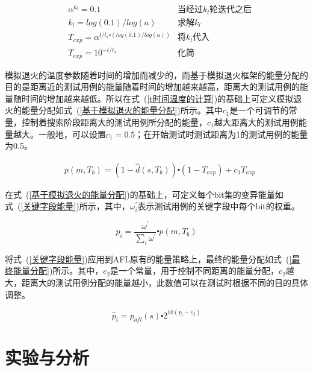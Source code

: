 \begin{equation}\label{t时间温度的计算}
\begin{aligned}
& \alpha^{k_{l}} = 0.1 & \text{当经过}k_{l}\text{轮迭代之后}\\
& k_{l} = log(0.1)/log(a) &\text{求解}k_{l}\\
& T_{exp} = \alpha^{t/t_{x} \centerdot (log(0.1)/log(a))} & \text{将}k_{l}\text{代入}\\
& T_{exp} = 10^{-t/t_{x}} &\text{化简}
\end{aligned}
\end{equation}

模拟退火的温度参数随着时间的增加而减少的，而基于模拟退火框架的能量分配的目的是距离近的测试用例的能量随着时间的增加越来越高，距离大的测试用例的能量随时间的增加越来越低。所以在式~(\ref{t时间温度的计算})的基础上可定义模拟退火的能量分配如式~(\ref{基于模拟退火的能量分配})所示。其中$c_{1}$是一个可调节的常量，控制着搜索阶段距离大的测试用例所分配的能量，$c_{1}$越大距离大的测试用例能量越大。一般地，可以设置$c_{1} = 0.5$；在开始测试时测试距离为1的测试用例的能量为0.5。

\begin{equation}\label{基于模拟退火的能量分配}
\begin{aligned}
& p(m,T_{b}) = (1- \hat{d}(s,T_{b})) \centerdot (1-T_{exp}) + c_{1}T_{exp}
\end{aligned}
\end{equation}

在式~(\ref{基于模拟退火的能量分配})的基础上，可定义每个bit集的变异能量如式~(\ref{关键字段能量})所示，其中，$\omega^{'}_{i}$表示测试用例的关键字段中每个bit的权重。

\begin{equation}\label{关键字段能量}
p_{i} = \frac{\omega^{'}}{\sum_{i} \omega^{'}} \centerdot p(m,T_{b})
\end{equation}

将式~(\ref{关键字段能量})应用到AFL原有的能量策略上，最终的能量分配如式~(\ref{最终能量分配})所示。其中，$c_{2}$是一个常量，用于控制不同距离的能量分配，$c_{2}$越大，距离大的测试用例分配的能量越小，此数值可以在测试时根据不同的目的具体调整。

\begin{equation}\label{最终能量分配}
\hat{p}_{i} = p_{afl}(s) \centerdot 2^{10(p_{i}-c_{2})}
\end{equation}

\section{实验与分析}

